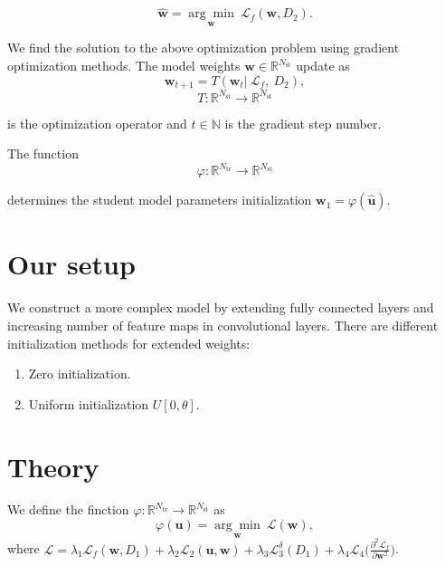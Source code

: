 \documentclass[80pt]{article}
\begin{document}
$$\hat{\mathbf{w}} =  \underset{\mathbf{w}}{\arg\min}~\mathcal{L}_f(\mathbf{w}, D_2).$$

We find the solution to the above optimization problem using gradient optimization methods. The model weights $\mathbf{w} \in \mathbb{R}^{N_{\text{st}}}$ update as
\[\mathbf{w}_{t+1} = T(\mathbf{w}_t |~\mathcal{L}_f,~D_2),\]
\[T: \mathbb{R}^{N_\text{st}} \rightarrow \mathbb{R}^{N_\text{st}}\]

is the optimization operator and $t \in \mathbb{N}$ is the gradient step number.

The function 
\[\varphi: \mathbb{R}^{N_\text{tr}} \rightarrow \mathbb{R}^{N_\text{st}}\]

determines the student model parameters initialization $\mathbf{w}_1 = \varphi(\hat{\mathbf{u}})$.

\section{Our setup}
\label{sec:setup}

We construct a more complex model by extending fully connected layers and increasing number of feature maps in convolutional layers. There are different initialization methods for extended weights:

\begin{enumerate}
    \item Zero initialization.
    \item Uniform initialization $U[0, \theta]$.
\end{enumerate}

\section{Theory}

We define the finction $\varphi: \mathbb{R}^{N_\text{tr}} \rightarrow \mathbb{R}^{N_\text{st}}$ as
$$\varphi(\mathbf{u}) = \underset{\mathbf{w}}{\arg\min}~\mathcal{L}(\mathbf{w}),$$
where $\mathcal{L} = \lambda_1 \mathcal{L}_f(\mathbf{w}, D_1) + \lambda_2 \mathcal{L}_2 (\mathbf{u}, \mathbf{w}) + \lambda_3 \mathcal{L}_3^\delta (D_1) + \lambda_4 \mathcal{L}_4 \bigl(\displaystyle \frac{\partial^2 \mathcal{L}_f}{\partial \mathbf{w}^2}\bigr)$.
\end{document}
